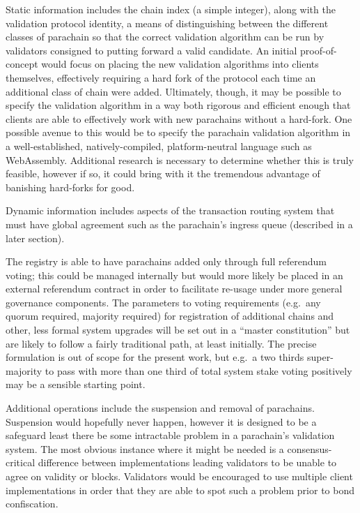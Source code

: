 \documentclass[9pt,oneside]{amsart}
\makeatletter
\newcommand*\eg{e.g.\@\xspace}
\makeatother
\begin{document}
\begin{multicols}{2}
 Static information includes the chain index (a simple integer), along with the validation protocol identity, a means of distinguishing between the different classes of parachain so that the correct validation algorithm can be run by validators consigned to putting forward a valid candidate. An initial proof-of-concept would focus on placing the new validation algorithms into clients themselves, effectively requiring a hard fork of the protocol each time an additional class of chain were added. Ultimately, though, it may be possible to specify the validation algorithm in a way both rigorous and efficient enough that clients are able to effectively work with new parachains without a hard-fork. One possible avenue to this would be to specify the parachain validation algorithm in a well-established, natively-compiled, platform-neutral language such as WebAssembly\cite{webassembly}. Additional research is necessary to determine whether this is truly feasible, however if so, it could bring with it the tremendous advantage of banishing hard-forks for good.

 Dynamic information includes aspects of the transaction routing system that must have global agreement such as the parachain's ingress queue (described in a later section).

 The registry is able to have parachains added only through full referendum voting; this could be managed internally but would more likely be placed in an external referendum contract in order to facilitate re-usage under more general governance components. The parameters to voting requirements (\eg~any quorum required, majority required) for registration of additional chains and other, less formal system upgrades will be set out in a ``master constitution'' but are likely to follow a fairly traditional path, at least initially. The precise formulation is out of scope for the present work, but \eg~a two thirds super-majority to pass with more than one third of total system stake voting positively may be a sensible starting point.

 Additional operations include the suspension and removal of parachains. Suspension would hopefully never happen, however it is designed to be a safeguard least there be some intractable problem in a parachain's validation system. The most obvious instance where it might be needed is a consensus-critical difference between implementations leading validators to be unable to agree on validity or blocks. Validators would be encouraged to use multiple client implementations in order that they are able to spot such a problem prior to bond confiscation.


\end{multicols}
\end{document}
